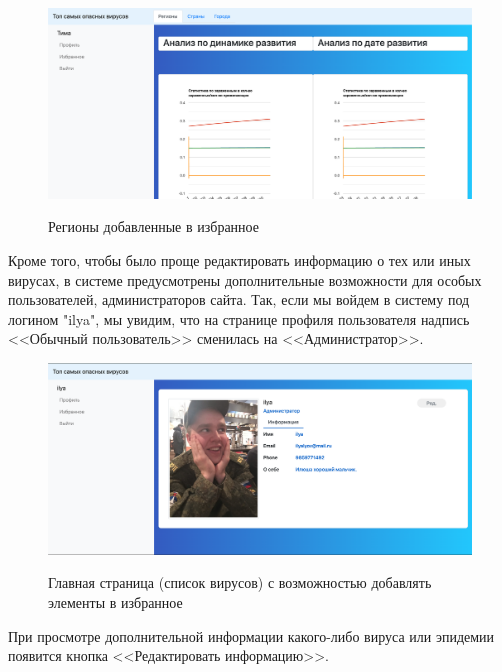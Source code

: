 \documentclass[a4paper,14pt]{extarticle}
\begin{document}
 	\begin{figure}[h!]
 		\begin{center}
 			{\includegraphics[width = \textwidth]{examples/graph1.png}}
 			\caption{Регионы добавленные в избранное}
 			\label{ris:graph1}
 		\end{center}
 	\end{figure}
	\newpage
 
 	
 	Кроме того, чтобы было проще редактировать информацию о тех или иных вирусах, в системе предусмотрены дополнительные возможности для особых пользователей, администраторов сайта. Так, если мы войдем в систему под логином "ilya", мы увидим, что на странице профиля пользователя надпись <<Обычный пользователь>> сменилась на <<Администратор>>.
 	
 	\begin{figure}[h!]
 		\begin{center}
 			{\includegraphics[width = \textwidth]{examples/profile_admin.png}}
 			\caption{
 				Главная страница (список вирусов) с возможностью добавлять элементы в избранное}
 			\label{ris:profile_admin}
 		\end{center}
 	\end{figure}
 	
 	При просмотре дополнительной информации какого-либо вируса или эпидемии появится кнопка <<Редактировать информацию>>.
 	
\end{document}
